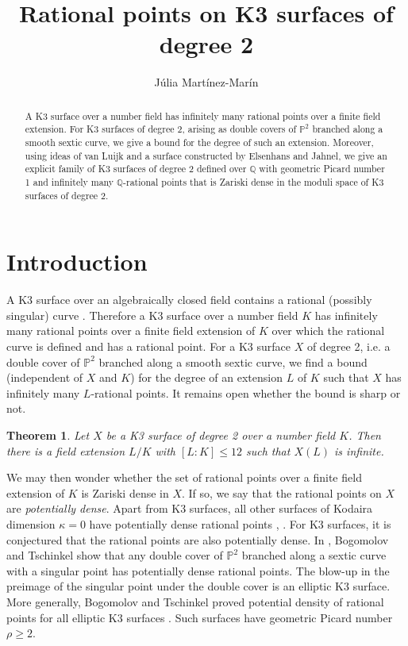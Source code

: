 \documentclass[11pt]{amsart}
\newcommand{\QQ}{\mathbb{Q}}
\newcommand{\PP}{\mathbb{P}}
\theoremstyle{plain}
\newtheorem{theorem}[lemma]{Theorem}
\theoremstyle{remark}
\begin{document}
\title{Rational points on K3 surfaces of degree 2}
\author{Júlia Martínez-Marín}
\address{School of Mathematics, University of Bristol, Bristol, BS8 1UG, UK}

\begin{abstract}
    A K3 surface over a number field has infinitely many rational points over a finite field extension. For K3 surfaces of degree 2, arising as double covers of $\PP^2$ branched along a smooth sextic curve, we give a bound for the degree of such an extension. Moreover, using ideas of van Luijk and a surface constructed by Elsenhans and Jahnel, we give an explicit family of K3 surfaces of degree 2 defined over $\QQ$ with geometric Picard number 1 and infinitely many $\QQ$-rational points that is Zariski dense in the moduli space of K3 surfaces of degree 2.
\end{abstract}


\maketitle

\section{Introduction}


A K3 surface over an algebraically closed field contains a rational (possibly singular) curve \cite[Appendix]{mm}. Therefore a K3 surface over a number field $K$ has infinitely many rational points over a finite field extension of $K$ over which the rational curve is defined and has a rational point. For a K3 surface $X$ of degree 2, i.e. a double cover of $\PP^2$ branched along a smooth sextic curve, we find a bound (independent of $X$ and $K$) for the degree of an extension $L$ of $K$ such that $X$ has infinitely many $L$-rational points. It remains open whether the bound is sharp or not. 

\begin{theorem}\label{bound}
     Let $X$ be a K3 surface of degree 2 over a number field $K$. Then there is a field extension $L/K$ with $[L:K]\leq 12$ such that $X(L)$ is infinite.
\end{theorem}

We may then wonder whether the set of rational points over a finite field extension of $K$ is Zariski dense in $X$. If so, we say that the rational points on $X$ are \emph{potentially dense}. Apart from K3 surfaces, all other surfaces of Kodaira dimension $\kappa=0$ have potentially dense rational points \cite[Proposition 4.2]{hasset}, \cite[Theorem 3.1]{enriques}. For K3 surfaces, it is conjectured that the rational points are also potentially dense. In \cite{bogo2}, Bogomolov and Tschinkel show that any double cover of $\PP^2$ branched along a sextic curve with a singular point has potentially dense rational points. The blow-up in the preimage of the singular point under the double cover is an elliptic K3 surface. More generally, Bogomolov and Tschinkel proved potential density of rational points for all elliptic K3 surfaces \cite{Bog}. Such surfaces have geometric Picard number $\rho \geq 2$. 
\end{document}
